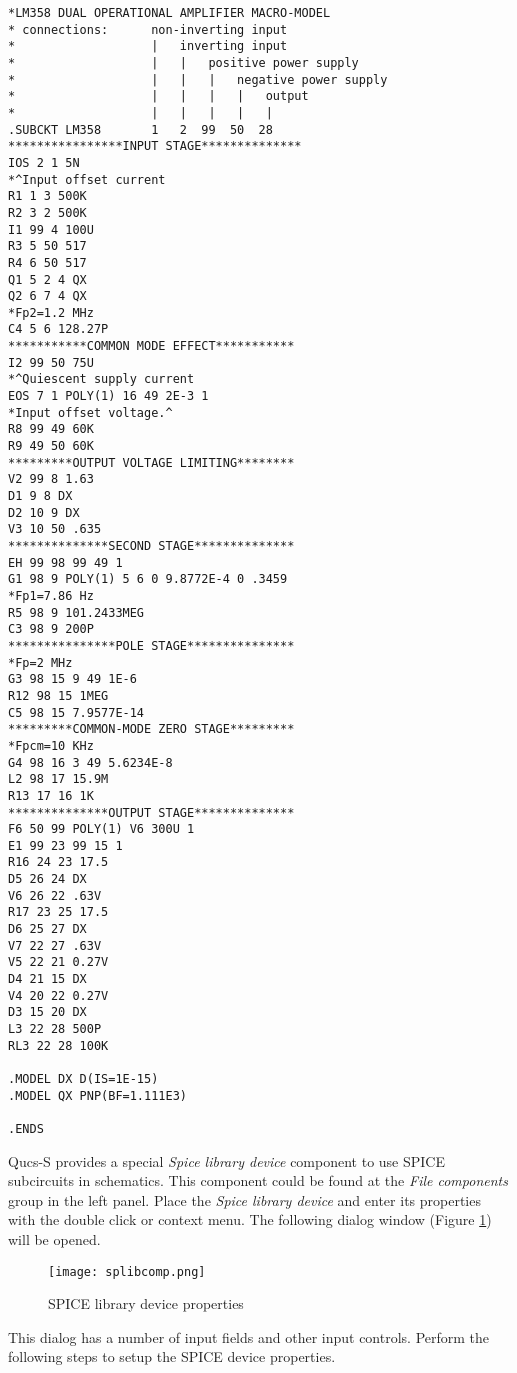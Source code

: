 \begin{verbatim}
*LM358 DUAL OPERATIONAL AMPLIFIER MACRO-MODEL
* connections:      non-inverting input
*                   |   inverting input
*                   |   |   positive power supply
*                   |   |   |   negative power supply
*                   |   |   |   |   output
*                   |   |   |   |   |
.SUBCKT LM358       1   2  99  50  28
****************INPUT STAGE**************
IOS 2 1 5N
*^Input offset current
R1 1 3 500K
R2 3 2 500K
I1 99 4 100U
R3 5 50 517
R4 6 50 517
Q1 5 2 4 QX
Q2 6 7 4 QX
*Fp2=1.2 MHz
C4 5 6 128.27P
***********COMMON MODE EFFECT***********
I2 99 50 75U
*^Quiescent supply current
EOS 7 1 POLY(1) 16 49 2E-3 1
*Input offset voltage.^
R8 99 49 60K
R9 49 50 60K
*********OUTPUT VOLTAGE LIMITING********
V2 99 8 1.63
D1 9 8 DX
D2 10 9 DX
V3 10 50 .635
**************SECOND STAGE**************
EH 99 98 99 49 1
G1 98 9 POLY(1) 5 6 0 9.8772E-4 0 .3459
*Fp1=7.86 Hz
R5 98 9 101.2433MEG
C3 98 9 200P
***************POLE STAGE***************
*Fp=2 MHz
G3 98 15 9 49 1E-6
R12 98 15 1MEG
C5 98 15 7.9577E-14
*********COMMON-MODE ZERO STAGE*********
*Fpcm=10 KHz
G4 98 16 3 49 5.6234E-8
L2 98 17 15.9M
R13 17 16 1K
**************OUTPUT STAGE**************
F6 50 99 POLY(1) V6 300U 1
E1 99 23 99 15 1
R16 24 23 17.5
D5 26 24 DX
V6 26 22 .63V
R17 23 25 17.5
D6 25 27 DX
V7 22 27 .63V
V5 22 21 0.27V
D4 21 15 DX
V4 20 22 0.27V
D3 15 20 DX
L3 22 28 500P
RL3 22 28 100K

.MODEL DX D(IS=1E-15)
.MODEL QX PNP(BF=1.111E3)

.ENDS
\end{verbatim}

Qucs-S provides a special \emph{Spice library device} component to use SPICE subcircuits in schematics. This component could be found at the \emph{File components} group in the left panel. Place the \emph{Spice library device} and enter its properties with the double click or context menu. The following dialog window (Figure \ref{fig:splibcomp}) will be opened.


    \begin{figure}[!ht]
    \begin{center}
        \texttt{[image: splibcomp.png]}
    \end{center}
    \caption{SPICE library device properties} \label{fig:splibcomp}
    \end{figure}

This dialog has a number of input fields and other input controls. Perform the following steps to setup the SPICE device properties.


